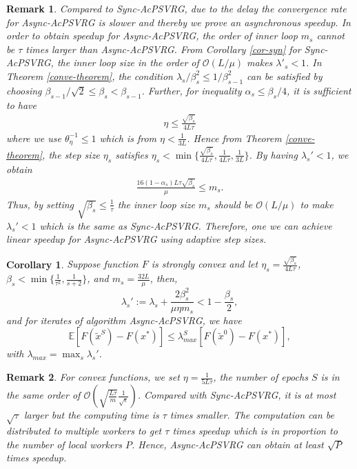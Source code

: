 \documentclass[letterpaper]{article} %
\newcommand*{\E}{\mathbb{E}}
\newtheorem{corollary}{Corollary}
\newtheorem{remark}{Remark}
\begin{document}
\begin{remark}
Compared to Sync-AcPSVRG, due to the delay the convergence rate for Async-AcPSVRG is slower and thereby we prove an asynchronous speedup. In order to obtain speedup for Async-AcPSVRG, the order of inner loop $m_s$ cannot be $\tau$ times larger than Async-AcPSVRG. From Corollary \ref{cor-syn} for Sync-AcPSVRG, the inner loop size in the order of $\mathcal{O}(L/\mu)$ makes $\lambda'_s<1$. In Theorem \ref{conve-theorem}, the condition $\lambda_s/\beta_s^2 \leq 1/\beta_{s-1}^2$ can be satisfied by choosing $\beta_{s-1}/\sqrt{2}\leq \beta_s < \beta_{s-1}$. Further, for inequality $\alpha_s\leq \beta_s/4$, it is sufficient to have 
\begin{equation}
\begin{split}
\eta \leq \frac{\sqrt{\beta_s}}{4L\tau}
\end{split}
\end{equation}
where we use  $\theta_\eta^{-1} \leq 1$ which is from $\eta< \frac{1}{3L}$.
Hence from Theorem \ref{conve-theorem}, the step size $\eta_s$ satisfies $\eta_s<\min\{\frac{\sqrt{\beta_s}}{4L\tau},\frac{1}{4L
\tau}, \frac{1}{3L}\}$. By having $\lambda_s'<1$, we obtain 
\begin{equation}
\begin{split}
\frac{16(1-\alpha_s)L\tau\sqrt{\beta_s}}{\mu} \leq m_s.
\end{split}
\end{equation}
Thus, by setting $\sqrt{\beta_s}\leq \frac{1}{\tau}$ the inner loop size $m_s$ should be $\mathcal{O}(L/\mu)$ to make $\lambda_s'<1$ which is the same as Sync-AcPSVRG. Therefore, one we can achieve linear speedup for Async-AcPSVRG using adaptive step sizes.
\end{remark}
\begin{corollary}\label{cor-asyn}
Suppose function $F$ is strongly convex and 
let $\eta_s=\frac{\sqrt{\beta_s}}{4L\tau}$, $\beta_s< \min\{\frac{1}{\tau^2},\frac{1}{s+2}\}$, and $m_s=\frac{32L}{\mu}$, then, 
\[
\lambda_s' := \lambda_s+{\frac{2 \beta_s^2}{\mu\eta m_s}} < 1-\frac{\beta_s}{2},
\]
and for iterates of algorithm Async-AcPSVRG, we have
\begin{equation}
\E\left[F(\widetilde{x}^S)-F(x^*)\right]\leq \lambda_{max}^S\left[F(\widetilde{x}^0)-F(x^*)\right], 
\end{equation}
with $\lambda_{max} = \max_{s}{\lambda_s'}$. 
\end{corollary}
\begin{remark}
For convex functions, we set $\eta=\frac{1}{5L\tau}$, the number of epochs $S$ is in the same order of $\mathcal{O}(\sqrt{\frac{L\tau}{m}}\frac{1}{\sqrt{\epsilon}})$.
Compared with Sync-AcPSVRG, it
is at most $\sqrt{\tau}$ larger but the computing time is $\tau$ times smaller.
The computation can be distributed to multiple
workers to get $\tau$ times speedup which is in proportion to the number of local workers $P$. Hence, Async-AcPSVRG can
obtain at least $\sqrt{P}$ times speedup.
\end{remark}
\end{document}
